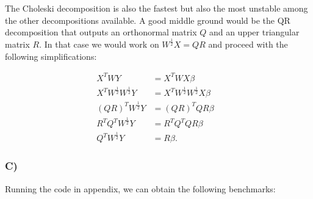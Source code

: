 \documentclass{article}
\begin{document}
The Choleski decomposition is also the fastest but also the most unstable among the other decompositions available. A good middle ground would be the QR decomposition that outputs an orthonormal matrix $Q$ and an upper triangular matrix $R$. In that case we would work on $W^{\frac{1}{2}}X=QR$ and proceed with the following simplifications:

\begin{align*}
X^TWY&=X^TWX\beta&\\
X^TW^{\frac{1}{2}}W^{\frac{1}{2}}Y&=X^TW^{\frac{1}{2}}W^{\frac{1}{2}}X\beta&\\
(QR)^TW^{\frac{1}{2}}Y&=(QR)^TQR\beta&\\
R^TQ^TW^{\frac{1}{2}}Y&=R^TQ^TQR\beta&\\
Q^TW^{\frac{1}{2}}Y&=R\beta.&
\end{align*}

\subsubsection*{C)}

Running the code in appendix, we can obtain the following benchmarks:\\
\end{document}
